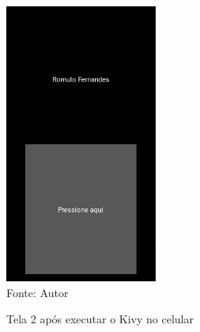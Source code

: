 \begin{figure}[H]
	\begin{center}
		\caption{Tela 2 após executar o Kivy no celular} \label{ling1}
		\includegraphics[width=5cm]{2mobile.JPG} \\
		{\tiny \sf Fonte:{ Autor}}
	\end{center}
\end{figure}